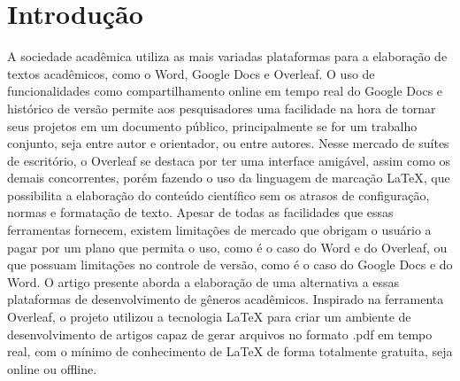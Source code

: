 \section{Introdução}

A sociedade acadêmica utiliza as mais variadas plataformas para a elaboração de textos acadêmicos, como o Word, Google Docs e Overleaf. O uso de funcionalidades como compartilhamento online em tempo real do Google Docs e histórico de versão permite aos pesquisadores uma facilidade na hora de tornar seus projetos em um documento público, principalmente se for um trabalho conjunto, seja entre autor e orientador, ou entre autores.
Nesse mercado de suítes de escritório, o Overleaf se destaca por ter uma interface amigável, assim como os demais concorrentes, porém fazendo o uso da linguagem de marcação LaTeX, que possibilita a elaboração do conteúdo científico sem os atrasos de configuração, normas e formatação de texto.
Apesar de todas as facilidades que essas ferramentas fornecem, existem limitações de mercado que obrigam o usuário a pagar por um plano que permita o uso, como é o caso do Word e do Overleaf, ou que possuam limitações no controle de versão, como é o caso do Google Docs e do Word.
O artigo presente aborda a elaboração de uma alternativa a essas plataformas de desenvolvimento de gêneros acadêmicos. Inspirado na ferramenta Overleaf, o projeto utilizou a tecnologia LaTeX para criar um ambiente de desenvolvimento de artigos capaz de gerar arquivos no formato .pdf em tempo real, com o mínimo de conhecimento de LaTeX de forma totalmente gratuita, seja online ou offline.
